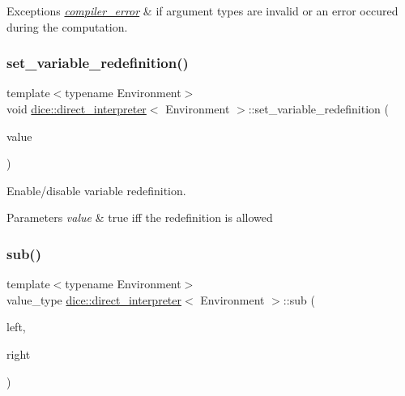 \begin{DoxyExceptions}{Exceptions}
{\em \mbox{\hyperlink{classdice_1_1compiler__error}{compiler\+\_\+error}}} & if argument types are invalid or an error occured during the computation. \\
\hline
\end{DoxyExceptions}
\mbox{\label{classdice_1_1direct__interpreter_a41fcd7b8d6d5fd1a3ef3b90856905eae}} 
\subsubsection{\texorpdfstring{set\+\_\+variable\+\_\+redefinition()}{set\_variable\_redefinition()}}
{\footnotesize\ttfamily template$<$typename Environment$>$ \\
void \mbox{\hyperlink{classdice_1_1direct__interpreter}{dice\+::direct\+\_\+interpreter}}$<$ Environment $>$\+::set\+\_\+variable\+\_\+redefinition (\begin{DoxyParamCaption}\item[{bool}]{value }\end{DoxyParamCaption})\hspace{0.3cm}{\ttfamily [inline]}}



Enable/disable variable redefinition. 


\begin{DoxyParams}{Parameters}
{\em value} & true iff the redefinition is allowed \\
\hline
\end{DoxyParams}
\mbox{\label{classdice_1_1direct__interpreter_a5b7c35ce989972138c8f1f01ccdfec03}} 
\subsubsection{\texorpdfstring{sub()}{sub()}}
{\footnotesize\ttfamily template$<$typename Environment$>$ \\
value\+\_\+type \mbox{\hyperlink{classdice_1_1direct__interpreter}{dice\+::direct\+\_\+interpreter}}$<$ Environment $>$\+::sub (\begin{DoxyParamCaption}\item[{value\+\_\+type}]{left,  }\item[{value\+\_\+type}]{right }\end{DoxyParamCaption})\hspace{0.3cm}{\ttfamily [inline]}}



